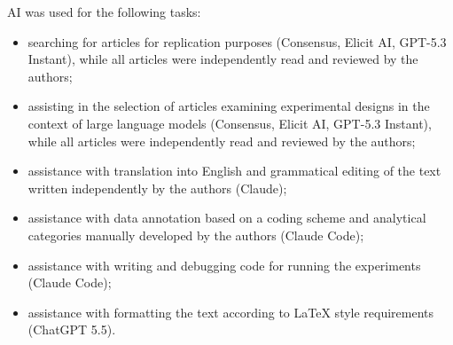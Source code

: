 \documentclass[14pt,a4paper]{extarticle}
\begin{document}
AI was used for the following tasks:
\begin{itemize}
\item searching for articles for replication purposes (Consensus, Elicit AI, GPT-5.3 Instant), while all articles were independently read and reviewed by the authors;
\item assisting in the selection of articles examining experimental designs in the context of large language models (Consensus, Elicit AI, GPT-5.3 Instant), while all articles were independently read and reviewed by the authors;
\item assistance with translation into English and grammatical editing of the text written independently by the authors (Claude);
\item assistance with data annotation based on a coding scheme and analytical categories manually developed by the authors (Claude Code);
\item assistance with writing and debugging code for running the experiments (Claude Code);
\item assistance with formatting the text according to LaTeX style requirements (ChatGPT 5.5).
\end{itemize}

\printbibliography
\end{document}
